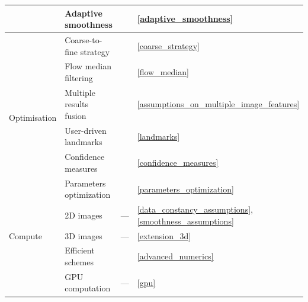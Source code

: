 \begin{table}[!ht]
\begin{tabular}{ |l|l|l|l| }
 & Adaptive smoothness & \cite{HarmonyFlow}   & \ref{adaptive_smoothness} \\ 
\hline
\multirow{6}{*}{\begin{sideways}Optimisation\end{sideways}} 
 & Coarse-to-fine strategy & \cite{Black96, Memin98, Brox04}   & \ref{coarse_strategy} \\
 & Flow median filtering & \cite{Wedel09, Sun14}   & \ref{flow_median} \\
 & Multiple results fusion & \cite{Lempitsky08}   & \ref{assumptions_on_multiple_image_features} \\
 & User-driven landmarks & \cite{Fischer03}     & \ref{landmarks} \\
 & Confidence measures & \cite{Fua93, Brown03, Bruhn06, Xu10}   & \ref{confidence_measures} \\
 & Parameters optimization & \cite{HarmonyFlow}   & \ref{parameters_optimization} \\ 
\hline
\multirow{3}{*}{\begin{sideways} Compute \hspace{7pt}  \end{sideways}} 
 & 2D images & ---    &  \ref{data_constancy_assumptions}, \ref{smoothness_assumptions} \\
 & 3D images & ---    &  \ref{extension_3d} \\
 & Efficient schemes & \cite{Brox04, BruhnThesis, CGF3013}    &  \ref{advanced_numerics}  \\
 & GPU computation & ---   & \ref{gpu} \\
\hline
\end{tabular}
\label{tab:models_overview}
\end{table}
